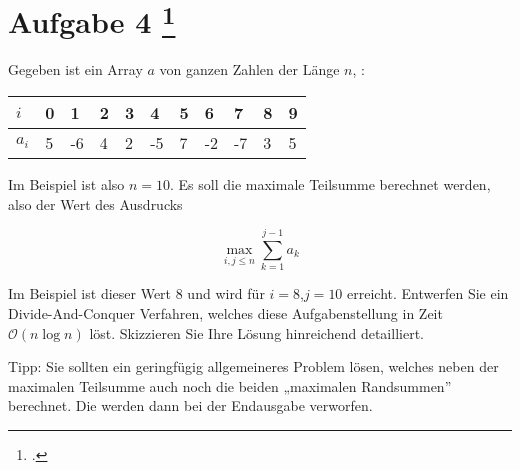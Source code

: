 \documentclass{bschlangaul-aufgabe}
\begin{document}
\section{Aufgabe 4
\footcite{examen:66115:2012:09}}

Gegeben ist ein Array $a$ von ganzen Zahlen der Länge $n$, \zB:

\begin{center}
\begin{tabular}{l|llllllllll}
$i$  & 0  & 1  & 2 & 3 & 4  & 5 & 6  & 7  & 8 & 9\\\hline
$a_i$ & 5 & -6 & 4 & 2 & -5 & 7 & -2 & -7 & 3 & 5\\
\end{tabular}
\end{center}

\noindent
Im Beispiel ist also $n = 10$. Es soll die maximale Teilsumme berechnet
werden, also der Wert des Ausdrucks

\begin{displaymath}
\max_{i,j \leq n} \sum^{j-1}_{k=1} a_k
\end{displaymath}

\noindent
Im Beispiel ist dieser Wert $8$ und wird für $i = 8$,$j = 10$ erreicht.
Entwerfen Sie ein Divide-And-Conquer Verfahren, welches diese
Aufgabenstellung in Zeit $\mathcal{O}(n \log n)$ löst. Skizzieren Sie
Ihre Lösung hinreichend detailliert.

Tipp: Sie sollten ein geringfügig allgemeineres Problem lösen, welches
neben der maximalen Teilsumme auch noch die beiden „maximalen
Randsummen” berechnet. Die werden dann bei der Endausgabe verworfen.

\end{document}
